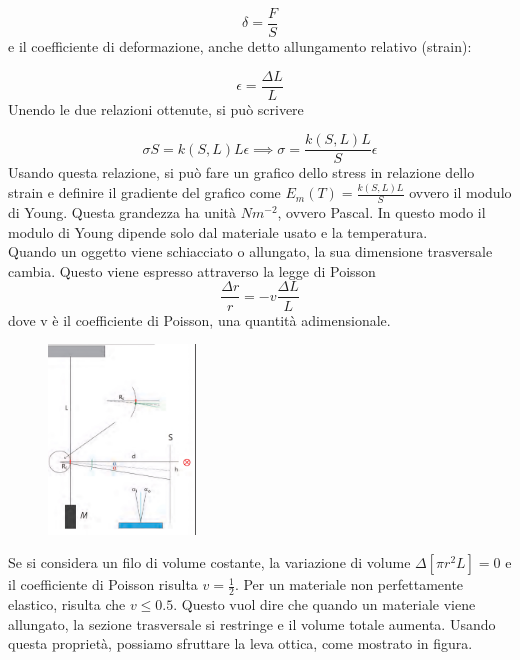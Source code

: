 \documentclass[a4paper]{article}
\begin{document}
\begin{equation}
    \delta = \frac{F}{S}
\end{equation}
e il coefficiente di deformazione, anche detto allungamento relativo (strain):

\begin{equation}
    \epsilon = \frac{\Delta L}{L}
\end{equation}
Unendo le due relazioni ottenute, si può scrivere 

\begin{equation}
    \sigma S = k(S,L)L \epsilon \implies \sigma = \frac{k(S,L)L}{S}\epsilon
\end{equation}
Usando questa relazione, si può fare un grafico dello stress in relazione dello strain e definire il gradiente del grafico come $E_m(T) = \frac{k(S,L)L}{S}$ ovvero il modulo di Young. Questa grandezza ha unità $Nm^{-2}$, ovvero Pascal. In questo modo il modulo di Young dipende solo dal materiale usato e la temperatura. \\
Quando un oggetto viene schiacciato o allungato, la sua dimensione trasversale cambia. Questo viene espresso attraverso la legge di Poisson 
\begin{equation}
    \frac{\Delta r}{r} = -v \frac{\Delta L}{L}
\end{equation}
dove v è il coefficiente di Poisson, una quantità adimensionale. 

\begin{figure}
    \vspace{-0.50cm}
    \begin{center}
    \includegraphics[width=0.35\textwidth, trim={0 0 4cm 0},clip=true]{fotoyoung/levaottica.jpg}
    \end{center}
\end{figure}


Se si considera un filo di volume costante, la variazione di volume $\Delta[\pi r^2L] = 0$ e il coefficiente di Poisson risulta $v = \frac{1}{2}$. Per un materiale non perfettamente elastico, risulta che $v \leq 0.5$. Questo vuol dire che quando un materiale viene allungato, la sezione trasversale si restringe e il volume totale aumenta. 
Usando questa proprietà, possiamo sfruttare la leva ottica, come mostrato in figura. 
\end{document}
